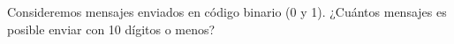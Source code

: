 \item Consideremos mensajes enviados en código binario (0 y 1). ¿Cuántos mensajes es posible enviar con 10 dígitos o menos?